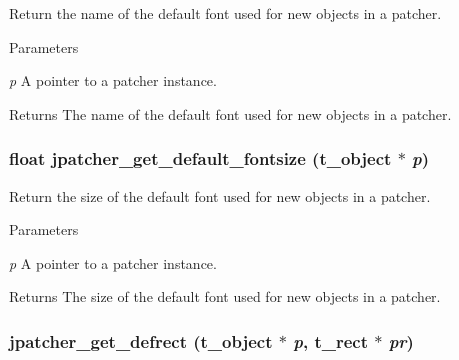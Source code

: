 Return the name of the default font used for new objects in a patcher. 
\begin{DoxyParams}{Parameters}
\item[{\em p}]A pointer to a patcher instance. \end{DoxyParams}
\begin{DoxyReturn}{Returns}
The name of the default font used for new objects in a patcher. 
\end{DoxyReturn}
\hypertarget{group__jpatcher_ga2a84ae15f52f7793d7e14d26cf555534}{
\subsubsection[{jpatcher\_\-get\_\-default\_\-fontsize}]{\setlength{\rightskip}{0pt plus 5cm}float jpatcher\_\-get\_\-default\_\-fontsize ({\bf t\_\-object} $\ast$ {\em p})}}
\label{group__jpatcher_ga2a84ae15f52f7793d7e14d26cf555534}


Return the size of the default font used for new objects in a patcher. 
\begin{DoxyParams}{Parameters}
\item[{\em p}]A pointer to a patcher instance. \end{DoxyParams}
\begin{DoxyReturn}{Returns}
The size of the default font used for new objects in a patcher. 
\end{DoxyReturn}
\hypertarget{group__jpatcher_ga177848d5433ff59335d06b15518f9df3}{
\subsubsection[{jpatcher\_\-get\_\-defrect}]{ jpatcher\_\-get\_\-defrect ({\bf t\_\-object} $\ast$ {\em p}, \/  {\bf t\_\-rect} $\ast$ {\em pr})}}
\label{group__jpatcher_ga177848d5433ff59335d06b15518f9df3}


